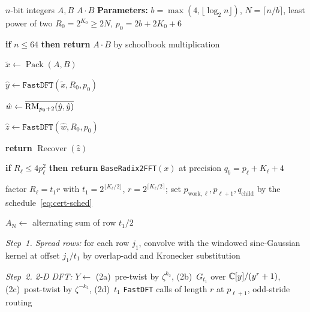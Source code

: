 \begin{algorithm}[!ht]
\caption{Integer multiplication on a single two-dimensional grid}\label{alg:main}
\small
\begin{algorithmic}[1]
\Require $n$-bit integers $A, B$
\Ensure $A \cdot B$
\Statex \textbf{Parameters:} $b = \max(4, \lfloor \log_2 n \rfloor)$, $N = \lceil n/b \rceil$, least power of two $R_0 = 2^{K_0} \ge 2N$, $p_0 = 2b + 2K_0 + 6$

\State \textbf{if} $n \le 64$ \textbf{then return} $A \cdot B$ by schoolbook multiplication

\State $\tilde{x} \gets \operatorname{Pack}(A, B)$ 

\State $\hat{y} \gets \texttt{FastDFT}(\tilde{x}, R_0, p_0)$

\State $\hat{w} \gets \overline{\operatorname{RM}_{p_0+2}(\hat{y}, \hat{y})}$ 

\State $\hat{z} \gets \texttt{FastDFT}(\hat{w}, R_0, p_0)$

\State \textbf{return} $\operatorname{Recover}(\hat{z})$ 

\vspace{2pt}
 

\State \textbf{if} $R_\ell \le 4 p_\ell^2$ \textbf{then return} \texttt{BaseRadix2FFT}$(x)$ at precision $q_b = p_\ell + K_\ell + 4$

\State factor $R_\ell = t_1 r$ with $t_1 = 2^{\lfloor K_\ell/2 \rfloor}$, $r = 2^{\lceil K_\ell/2 \rceil}$; set $p_{\mathrm{work},\ell}, p_{\ell+1}, q_{\mathrm{child}}$ by the schedule~\eqref{eq:cert-sched}

\State $A_{\mathrm{N}} \gets$ alternating sum of row $t_1/2$ \Comment{\eqref{eq:nyquist-id}}

\State \emph{Step~1. Spread rows:} for each row $j_1$, convolve with the windowed sinc-Gaussian kernel at offset $j_1/t_1$ by overlap-add and Kronecker substitution 

\State \emph{Step~2. 2-D DFT:} $Y \gets$ (2a)~pre-twist by $\zeta^{k_2}$, (2b)~$G_{t_1}$ over \mbox{$\mathbb{C}[y]/(y^r+1)$}, (2c)~post-twist by $\zeta^{-k_2}$, (2d)~$t_1$ \texttt{FastDFT} calls of length $r$ at $p_{\ell+1}$, odd-stride routing 


\end{algorithmic}
\end{algorithm}
